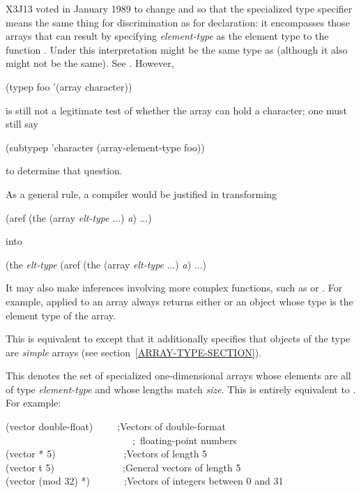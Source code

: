 \begin{flushdesc}
\begin{new}
X3J13 voted in January 1989
to change  and 
so that the specialized  type specifier
means the same thing for discrimination
as for declaration: it encompasses those arrays
that can result by specifying \emph{element-type} as the element type
to the function .
Under this interpretation  might be
the same type as 
(although it also might not be the same).
See .
However,
\begin{lisp}
(typep foo '(array character))
\end{lisp}
is still not a legitimate test of whether the array
 can hold a character; one must still say
\begin{lisp}
(subtypep 'character (array-element-type foo))
\end{lisp}
to determine that question.

As a general rule, a compiler would be justified in transforming
\begin{lisp}
(aref (the (array \emph{elt-type} ...) \emph{a}) ...)
\end{lisp}
into
\begin{lisp}
(the \emph{elt-type} (aref (the (array \emph{elt-type} ...) \emph{a}) ...)
\end{lisp}
It may also make inferences involving more complex functions,
such as  or .
For example,  applied to an array always returns either 
or an object whose type is the element type of the array.
\end{new}


\item[\cd{(simple-array \emph{element-type} \emph{dimensions})}]
This is equivalent
to  except that it additionally
specifies that objects of the type are \emph{simple} arrays
(see section~\ref{ARRAY-TYPE-SECTION}).

\item[\cd{(vector \emph{element-type} \emph{size})}]
This denotes the set of
specialized one-dimensional arrays whose elements are all of type \emph{
element-type} and whose lengths match \emph{size}.  This is entirely equivalent to
.
For example:
\begin{lisp}
(vector double-float)~~~~~;\textrm{Vectors of double-format} \\
~~~~~~~~~~~~~~~~~~~~~~~~~~;~\textrm{floating-point numbers} \\
(vector * 5)~~~~~~~~~~~~~~;\textrm{Vectors of length 5} \\
(vector t 5)~~~~~~~~~~~~~~;\textrm{General vectors of length 5} \\
(vector (mod 32) *)~~~~~~~;\textrm{Vectors of integers between 0 and 31}
\end{lisp}


\end{flushdesc}

